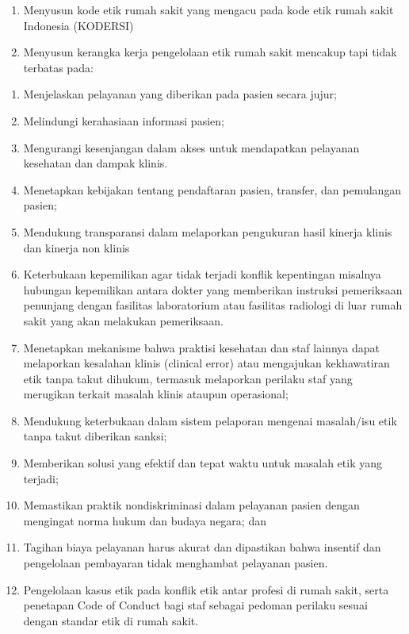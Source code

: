 \documentclass[
]{book}
\providecommand{\tightlist}{%
  \setlength{\itemsep}{0pt}\setlength{\parskip}{0pt}}
\begin{document}
\begin{enumerate}
\def\labelenumi{\alph{enumi}.}
\tightlist
\item
  Menyusun kode etik rumah sakit yang mengacu pada kode etik rumah sakit Indonesia (KODERSI)
\item
  Menyusun kerangka kerja pengelolaan etik rumah sakit mencakup tapi tidak terbatas pada:
\end{enumerate}

\begin{enumerate}
\def\labelenumi{\arabic{enumi}.}
\tightlist
\item
  Menjelaskan pelayanan yang diberikan pada pasien secara jujur;
\item
  Melindungi kerahasiaan informasi pasien;
\item
  Mengurangi kesenjangan dalam akses untuk mendapatkan pelayanan kesehatan dan dampak klinis.
\item
  Menetapkan kebijakan tentang pendaftaran pasien, transfer, dan pemulangan pasien;
\item
  Mendukung transparansi dalam melaporkan pengukuran hasil kinerja klinis dan kinerja non klinis
\item
  Keterbukaan kepemilikan agar tidak terjadi konflik kepentingan misalnya hubungan kepemilikan antara dokter yang memberikan instruksi pemeriksaan penunjang dengan fasilitas laboratorium atau fasilitas radiologi di luar rumah sakit yang akan melakukan pemeriksaan.
\item
  Menetapkan mekanisme bahwa praktisi kesehatan dan staf lainnya dapat melaporkan kesalahan klinis (clinical error) atau mengajukan kekhawatiran etik tanpa takut dihukum, termasuk melaporkan perilaku staf yang merugikan terkait masalah klinis ataupun operasional;
\item
  Mendukung keterbukaan dalam sistem pelaporan mengenai masalah/isu etik tanpa takut diberikan sanksi;
\item
  Memberikan solusi yang efektif dan tepat waktu untuk masalah etik yang terjadi;
\item
  Memastikan praktik nondiskriminasi dalam pelayanan pasien dengan mengingat norma hukum dan budaya negara; dan
\item
  Tagihan biaya pelayanan harus akurat dan dipastikan bahwa insentif dan pengelolaan pembayaran tidak menghambat pelayanan pasien.
\item
  Pengelolaan kasus etik pada konflik etik antar profesi di rumah sakit, serta penetapan Code of Conduct bagi staf sebagai pedoman perilaku sesuai dengan standar etik di rumah sakit.
\end{enumerate}
\end{document}
